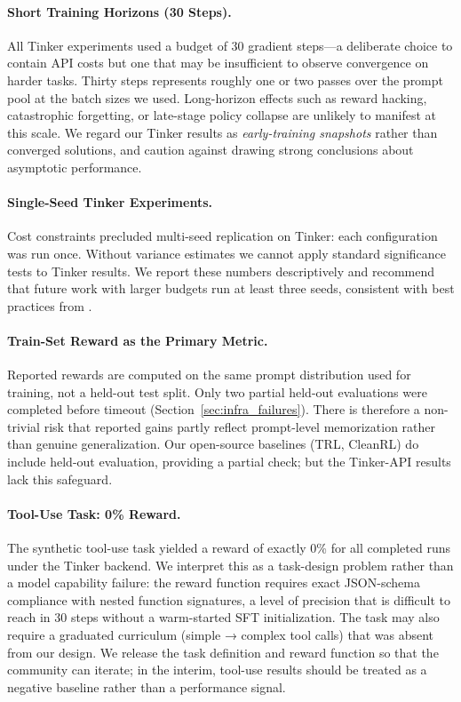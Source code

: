 \documentclass{article}
\begin{document}
\paragraph{Short Training Horizons (30 Steps).}
All Tinker experiments used a budget of 30 gradient steps---a deliberate choice
to contain API costs but one that may be insufficient to observe convergence
on harder tasks. Thirty steps represents roughly one or two passes over the
prompt pool at the batch sizes we used. Long-horizon effects such as reward
hacking, catastrophic forgetting, or late-stage policy collapse are unlikely
to manifest at this scale. We regard our Tinker results as \emph{early-training
snapshots} rather than converged solutions, and caution against drawing strong
conclusions about asymptotic performance.

\paragraph{Single-Seed Tinker Experiments.}
Cost constraints precluded multi-seed replication on Tinker: each configuration
was run once. Without variance estimates we cannot apply standard significance
tests to Tinker results. We report these numbers descriptively and recommend
that future work with larger budgets run at least three seeds, consistent with
best practices from \citet{henderson2018deep}.

\paragraph{Train-Set Reward as the Primary Metric.}
Reported rewards are computed on the same prompt distribution used for
training, not a held-out test split. Only two partial held-out evaluations
were completed before timeout (Section~\ref{sec:infra_failures}). There is
therefore a non-trivial risk that reported gains partly reflect prompt-level
memorization rather than genuine generalization. Our open-source baselines
(TRL, CleanRL) do include held-out evaluation, providing a partial check;
but the Tinker-API results lack this safeguard.

\paragraph{Tool-Use Task: 0\% Reward.}
The synthetic tool-use task yielded a reward of exactly 0\% for all completed
runs under the Tinker backend. We interpret this as a task-design problem
rather than a model capability failure: the reward function requires exact
JSON-schema compliance with nested function signatures, a level of precision
that is difficult to reach in 30 steps without a warm-started SFT initialization.
The task may also require a graduated curriculum (simple → complex tool calls)
that was absent from our design. We release the task definition and reward
function so that the community can iterate; in the interim, tool-use results
should be treated as a negative baseline rather than a performance signal.
\end{document}
